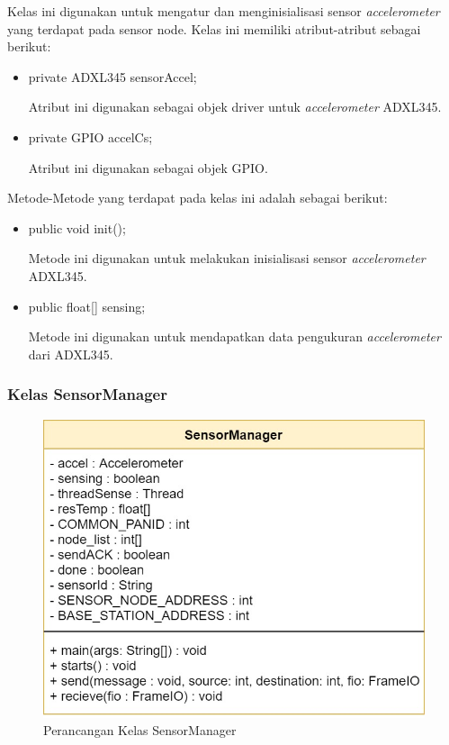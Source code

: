 Kelas ini digunakan untuk mengatur dan menginisialisasi sensor \textit{accelerometer} yang terdapat pada sensor node. Kelas ini memiliki atribut-atribut sebagai berikut:
\begin{itemize}
    \item private ADXL345 sensorAccel; 
    
    Atribut ini digunakan sebagai objek driver untuk \textit{accelerometer} ADXL345.
    \item private GPIO accelCs; 
    
    Atribut ini digunakan sebagai objek GPIO.
\end{itemize}
Metode-Metode yang terdapat pada kelas ini adalah sebagai berikut:
\begin{itemize}
    \item public void init(); 
    
    Metode ini digunakan untuk melakukan inisialisasi sensor \textit{accelerometer} ADXL345.
    \item public float[] sensing; 
    
    Metode ini digunakan untuk mendapatkan data pengukuran \textit{accelerometer} dari ADXL345.
\end{itemize}

\subsubsection{Kelas SensorManager}
\begin{figure}[H] 
	\centering  
	\includegraphics[scale=0.3]{Gambar/sensorManager_class.jpg}
	\caption[Perancangan Kelas SensorManager]{Perancangan Kelas SensorManager}
	\label{fig:sensorManager_class} 
\end{figure}

